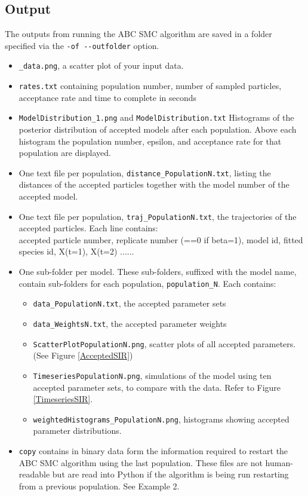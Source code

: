 \documentclass[a4paper]{report}
\begin{document}
\subsection{Output}
The outputs from running the ABC SMC algorithm are saved in a folder specified via the \verb$-of --outfolder$ option.
\begin{itemize}
	\item \verb$_data.png$, a scatter plot of your input data.
	\item \verb$rates.txt$ containing population number, number of sampled particles, acceptance rate and time to complete in seconds
	\item \verb$ModelDistribution_1.png$ and \verb$ModelDistribution.txt$ Histograms of the posterior distribution of accepted models after each population. Above each histogram the population number, epsilon, and acceptance rate for that population are displayed.
	\item One text file per population, \verb$distance_PopulationN.txt$, listing the distances of the accepted particles together with the model number of the accepted model.
	\item One text file per population, \verb$traj_PopulationN.txt$, the trajectories of the accepted particles. Each line contains:\\
	 accepted particle number, replicate number (==0 if beta=1), model id, fitted species id, X(t=1), X(t=2) ...... 

\item One sub-folder per model. These sub-folders, suffixed with the model name, contain sub-folders for each population, \verb$population_N$. Each contains:
\begin{itemize}
\item \verb$data_PopulationN.txt$, the accepted parameter sets
\item \verb$data_WeightsN.txt$, the accepted parameter weights
\item \verb$ScatterPlotPopulationN.png$, scatter plots of all accepted parameters. (See Figure \ref{AcceptedSIR})
\item \verb$TimeseriesPopulationN.png$, simulations of the model using ten accepted parameter sets, to compare with the data. Refer to Figure \ref{TimeseriesSIR}.
\item \verb$weightedHistograms_PopulationN.png$, histograms showing accepted parameter distributions.
\end{itemize}
\item \verb$copy$ contains in binary data form the information required to restart the ABC SMC algorithm using the last population. These files are not human-readable but are read into Python if the algorithm is being run restarting from a previous population. See Example 2.
\end{itemize}
\end{document}
